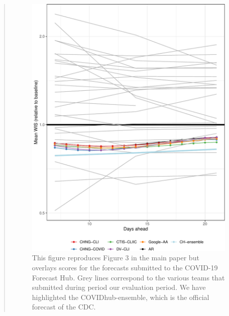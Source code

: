 \documentclass[11pt]{article}
\newenvironment{resp}{\begin{quote}\color{cobalt}}{\end{quote}}
\begin{document}
\begin{resp}
  \begin{figure}[tb]
    \centering
    \includegraphics[width=.9\textwidth]{fig/compare-to-hub-mean-1.pdf}
    \caption{This figure reproduces Figure 3 in the main paper but overlays
      scores for the forecasts submitted to the COVID-19 Forecast Hub. Grey
      lines correspond to the various teams that submitted during period our
      evaluation period. We have highlighted the COVIDhub-ensemble, which is the
      official forecast of the CDC.}
    \label{fig:compare-to-hub-mean}
  \end{figure}


\end{resp}
\end{document}
